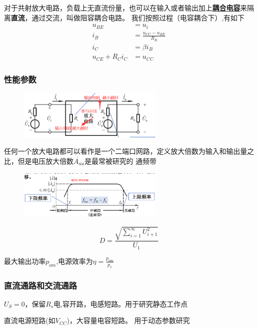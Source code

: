 对于共射放大电路，负载上无直流份量，也可以在输入或者输出加上\underline{\textbf{耦合电容}}来隔离\textbf{直流}，通过交流，叫做阻容耦合电路。
我们按照过程（电容耦合下）,有如下
\begin{align}
u_{BE}&=u_i \tag{3.1.a}\\
i_{B}&=\frac{u_{CC}-u_{BE}}{R_{B}} \tag{3.1.b}\\
i_{C}&=\beta i_{B} \tag{3.1.c}\\
u_{CE}+R_Ci_C&=u_{CC}    \tag{3.1.d}
\end{align}
\subsubsection{性能参数}
\begin{figure}[H]
    \includegraphics[width=7cm]{img/2.3.png}
    \end{figure}
    
任何一个放大电路都可以看作是一个二端口网路，定义放大倍数为输入和输出量之比，但是电压放大倍数$\dot{A_{uu}}$是最常被研究的
通频带
\begin{figure}[H]
        \includegraphics[width=7cm]{img/2.2.png}
        \end{figure}

\begin{definition}[非线性失真系数]
$$
D=\frac{\sqrt{\sum_{i=1}^{\infty}{U_{i+1}^2}}}{U_1}
$$
\end{definition}
最大输出功率$p_{om}$,电源效率为$\eta=\frac{p_{om}}{p_v}$
\subsubsection{直流通路和交流通路}
\begin{description}[leftmargin=1.7cm,style=nextline,nosep]%
    \item[直流通路] $U_S=0$，保留$R_s$电,容开路，电感短路。用于研究静态工作点
    \item[交流通路] 直流电源短路(如$V_{CC}$)，大容量电容短路。  用于动态参数研究
\end{description}

